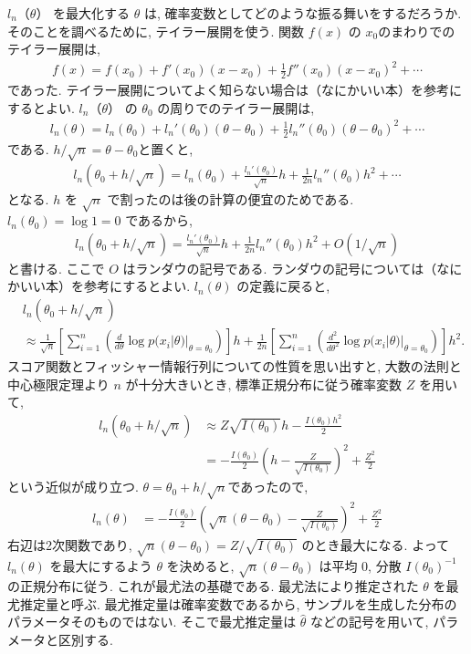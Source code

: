 \documentclass[a4paper, 12pt]{jarticle}
\begin{document}
$l_n（\theta）$ を最大化する $\theta$ は, 確率変数としてどのような振る舞いをするだろうか. 
そのことを調べるために, テイラー展開を使う. 
関数 $f(x)$ の $x_0$のまわりでのテイラー展開は, 
\begin{align}
f(x)= f(x_0) +f'(x_0) (x-x_0) + \frac{1}{2}f''(x_0)(x-x_0)^2 + \cdots 
\end{align}
であった. テイラー展開についてよく知らない場合は（なにかいい本）を参考にするとよい. 
$l_n（\theta）$ の $\theta_0$ の周りでのテイラー展開は, 
\begin{align}
l_n(\theta)= l_n(\theta_0) +l_n'(\theta_0) (\theta-\theta_0) + \frac{1}{2}l_n''(\theta_0)(\theta-\theta_0)^2 + \cdots 
\end{align}
である. 
$h/\sqrt{n}=\theta-\theta_0$と置くと, 
\begin{align}
l_n(\theta_0 + h/\sqrt{n})= l_n(\theta_0) +\frac{l_n'(\theta_0)}{\sqrt{n}}h+ \frac{1}{2n}l_n''(\theta_0)h^2 + \cdots 
\end{align}
となる. $h$ を $\sqrt{n}$ で割ったのは後の計算の便宜のためである.
$l_n(\theta_0) = \log{1} =0$ であるから, 
\begin{align}
l_n(\theta _0+ h/\sqrt{n})= \frac{l_n'(\theta_0)}{\sqrt{n}}h+ \frac{1}{2n}l_n''(\theta_0)h^2 + O(1/\sqrt{n})
\end{align}
と書ける.  ここで $O$ はランダウの記号である. ランダウの記号については（なにかいい本）を参考にするとよい. 
$l_n(\theta)$ の定義に戻ると, 
\begin{align}
&l_n(\theta_0 + h/\sqrt{n})  \nonumber \\
&\approx \frac{1}{\sqrt{n}} \left[\sum_{i=1}^{n} \left( \frac{d}{d \theta}  \log p(x_i | \theta) |_{\theta=\theta_0} \right)\right] h+ \frac{1}{2n}\left[  \sum_{i=1}^{n}\left(\frac{d^2}{d \theta^2} \log p(x_i | \theta)|_{\theta=\theta_0}\right)\right] h^2. 
\end{align}
スコア関数とフィッシャー情報行列についての性質を思い出すと, 大数の法則と中心極限定理より $n$ が十分大きいとき,  標準正規分布に従う確率変数 $Z$ を用いて, 
\begin{align}
l_n(\theta_0 + h/\sqrt{n}) &\approx Z \sqrt{I(\theta_0)} h  - \frac{I(\theta_0) h^2}{2} \\
&= -\frac{I(\theta_0)}{2}\left(h - \frac{Z}{\sqrt{I(\theta_0)}}\right)^2 + \frac{Z^2}{2}
\end{align}
という近似が成り立つ. $\theta=\theta_0 + h/\sqrt{n}$であったので,
\begin{align}
l_n(\theta)&= -\frac{I(\theta_0)}{2}\left(\sqrt{n}(\theta - \theta_0 )- \frac{Z}{\sqrt{I(\theta_0)}}\right)^2 + \frac{Z^2}{2}
\label{reslik}
\end{align}
右辺は2次関数であり, $\sqrt{n}(\theta - \theta_0) = Z/\sqrt{I(\theta_0)}$ のとき最大になる.
よって $l_n(\theta)$ を最大にするよう $\theta$ を決めると, $\sqrt{n}(\theta - \theta_0)$ は平均 0, 分散 $I(\theta_0)^{-1}$ の正規分布に従う.
これが最尤法の基礎である.
最尤法により推定された $\theta$ を最尤推定量と呼ぶ. 最尤推定量は確率変数であるから, サンプルを生成した分布のパラメータそのものではない. 
そこで最尤推定量は $\hat \theta$ などの記号を用いて, パラメータと区別する. 
\end{document}
